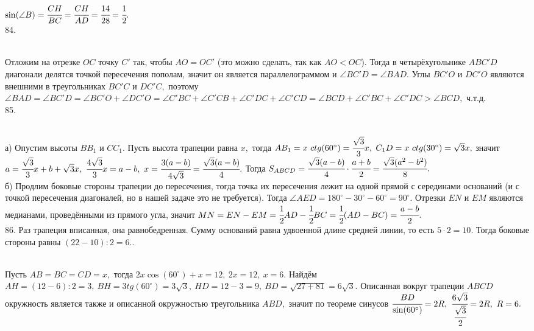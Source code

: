 $\sin(\angle B)=\cfrac{CH}{BC}=\cfrac{CH}{AD}=\cfrac{14}{28}=\cfrac{1}{2}.$\\
84. \begin{figure}[ht!]
\end{figure}\\
Отложим на отрезке $OC$ точку $C'$ так, чтобы $AO=OC'$ (это можно сделать, так как $AO<OC$). Тогда в четырёхугольнике $ABC'D$ диагонали делятся точкой пересечения пополам, значит он является параллелограммом и $\angle BC'D=\angle BAD.$ Углы $BC'O$ и $DC'O$ являются внешними в треугольниках $BC'C$ и $DC'C,$ поэтому $\angle BAD=\angle BC'D=\angle BC'O+\angle DC'O=\angle C'BC+\angle C'CB+\angle C'DC+\angle C'CD=\angle BCD+\angle C'BC+\angle C'DC>\angle BCD,$ ч.т.д.\\
85. \begin{figure}[ht!]
\end{figure}\\
а) Опустим высоты $BB_1$ и $CC_1.$ Пусть высота трапеции равна $x,$ тогда $AB_1=x\ ctg(60^\circ)=\cfrac{\sqrt{3}}{3}x,\ C_1D=x\ ctg(30^\circ)=\sqrt{3}x,$ значит $a=
\cfrac{\sqrt{3}}{3}x+b+\sqrt{3}x,\ \cfrac{4\sqrt{3}}{3}x=a-b,\ x=\cfrac{3(a-b)}{4\sqrt{3}}=\cfrac{\sqrt{3}(a-b)}{4}.$ Тогда
$S_{ABCD}=\cfrac{\sqrt{3}(a-b)}{4}\cdot\cfrac{a+b}{2}=\cfrac{\sqrt{3}(a^2-b^2)}{8}.$\\
б) Продлим боковые стороны трапеции до пересечения, тогда точка их пересечения лежит на одной прямой с серединами оснований (и с точкой пересечения диагоналей, но в нашей задаче это не требуется). Тогда $\angle AED=180^\circ-30^\circ-60^\circ=90^\circ.$ Отрезки $EN$ и $EM$ являются медианами, проведёнными из прямого угла, значит $MN=EN-EM=\cfrac{1}{2}AD-\cfrac{1}{2}BC=\cfrac{1}{2}(AD-BC)=\cfrac{a-b}{2}.$\\
86. Раз трапеция вписанная, она равнобедренная. Сумму оснований равна удвоенной длине средней линии, то есть $5\cdot2=10.$ Тогда боковые стороны равны $(22-10):2=6.$\newpage{}. \begin{figure}[ht!]
\end{figure}\\
Пусть $AB=BC=CD=x,$ тогда $2x\cos(60^\circ)+x=12,\ 2x=12,\ x=6.$ Найдём $AH=(12-6):2=3,\ BH=3tg(60^\circ)=3\sqrt{3},\ HD=12-3=9,\ BD=\sqrt{27+81}=6\sqrt{3}.$ Описанная вокруг трапеции $ABCD$ окружность является также и описанной окружностью треугольника $ABD,$ значит по теореме синусов $\cfrac{BD}{\sin(60^\circ)}=2R,\ \cfrac{6\sqrt{3}}{\cfrac{\sqrt{3}}{2}}=2R,\ R=6.$\\
